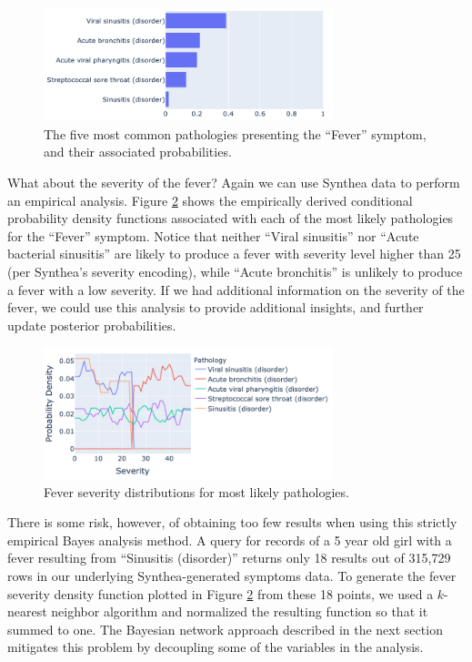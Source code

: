 \documentclass[11pt]{article}
\begin{document}
\begin{figure}[!hbt]\centering
  \includegraphics[width=0.75\textwidth]{figures/fever-pathologies.png}
  \caption{The five most common pathologies presenting the ``Fever'' symptom, and their associated probabilities. \label{fig: fever-pathologies}}
\end{figure}

What about the severity of the fever?  Again we can use Synthea data to perform an empirical analysis.  Figure \ref{fig: fever-severity} shows the empirically derived conditional probability density functions associated with each of the most likely pathologies for the ``Fever'' symptom.  Notice that neither ``Viral sinusitis'' nor ``Acute bacterial sinusitis'' are likely to produce a fever with severity level higher than 25 (per Synthea's severity encoding), while ``Acute bronchitis'' is unlikely to produce a fever with a low severity.  If we had additional information on the severity of the fever, we could use this analysis to provide additional insights, and further update posterior probabilities. 

\begin{figure}[!hbt]\centering
  \includegraphics[width=0.75\textwidth]{figures/fever-severity.png}
  \caption{Fever severity distributions for most likely pathologies. \label{fig: fever-severity}}
\end{figure}

There is some risk, however, of obtaining too few results when using this strictly empirical Bayes analysis method.  A query for records of a 5 year old girl with a fever resulting from ``Sinusitis (disorder)'' returns only 18 results out of 315,729 rows in our underlying Synthea-generated symptoms data.  To generate the fever severity density function plotted in Figure \ref{fig: fever-severity} from these 18 points, we used a $k$-nearest neighbor algorithm and normalized the resulting function so that it summed to one. The Bayesian network approach described in the next section mitigates this problem by decoupling some of the variables in the analysis.  
\end{document}
